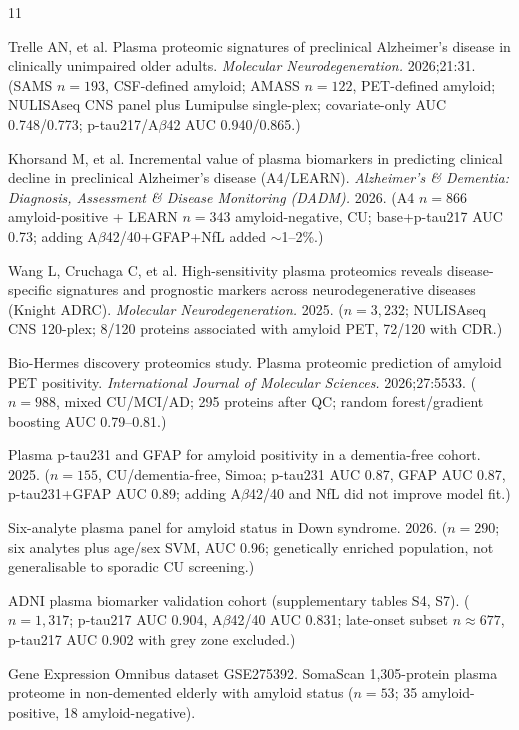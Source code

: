 \documentclass{article}
\begin{document}
\begin{thebibliography}{11}

Trelle AN, et al.
Plasma proteomic signatures of preclinical Alzheimer's disease in clinically
unimpaired older adults.
\textit{Molecular Neurodegeneration.} 2026;21:31.
(SAMS $n=193$, CSF-defined amyloid; AMASS $n=122$, PET-defined amyloid;
NULISAseq CNS panel plus Lumipulse single-plex; covariate-only AUC 0.748/0.773;
p-tau217/A$\beta$42 AUC 0.940/0.865.)

Khorsand M, et al.
Incremental value of plasma biomarkers in predicting clinical decline in
preclinical Alzheimer's disease (A4/LEARN).
\textit{Alzheimer's \& Dementia: Diagnosis, Assessment \& Disease Monitoring
(DADM).} 2026.
(A4 $n=866$ amyloid-positive + LEARN $n=343$ amyloid-negative, CU;
base+p-tau217 AUC 0.73; adding A$\beta$42/40+GFAP+NfL added $\sim$1--2\%.)

Wang L, Cruchaga C, et al.
High-sensitivity plasma proteomics reveals disease-specific signatures and
prognostic markers across neurodegenerative diseases (Knight ADRC).
\textit{Molecular Neurodegeneration.} 2025.
($n=3{,}232$; NULISAseq CNS 120-plex; 8/120 proteins associated with amyloid
PET, 72/120 with CDR.)

Bio-Hermes discovery proteomics study.
Plasma proteomic prediction of amyloid PET positivity.
\textit{International Journal of Molecular Sciences.} 2026;27:5533.
($n=988$, mixed CU/MCI/AD; 295 proteins after QC; random forest/gradient
boosting AUC 0.79--0.81.)

Plasma p-tau231 and GFAP for amyloid positivity in a dementia-free cohort. 2025.
($n=155$, CU/dementia-free, Simoa; p-tau231 AUC 0.87, GFAP AUC 0.87,
p-tau231+GFAP AUC 0.89; adding A$\beta$42/40 and NfL did not improve model fit.)

Six-analyte plasma panel for amyloid status in Down syndrome. 2026.
($n=290$; six analytes plus age/sex SVM, AUC 0.96; genetically enriched
population, not generalisable to sporadic CU screening.)

ADNI plasma biomarker validation cohort (supplementary tables S4, S7).
($n=1{,}317$; p-tau217 AUC 0.904, A$\beta$42/40 AUC 0.831; late-onset subset
$n\approx677$, p-tau217 AUC 0.902 with grey zone excluded.)

Gene Expression Omnibus dataset GSE275392.
SomaScan 1{,}305-protein plasma proteome in non-demented elderly with amyloid
status ($n=53$; 35 amyloid-positive, 18 amyloid-negative).


\end{thebibliography}
\end{document}
